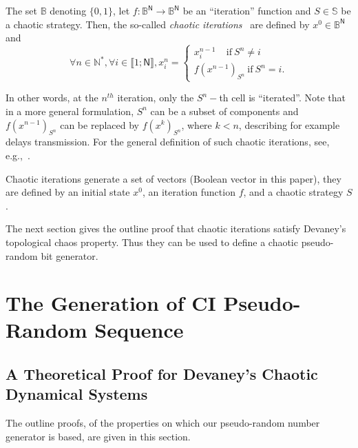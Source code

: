 \documentclass[journal]{IEEEtran}
\begin{document}
\begin{definition}
The set $\mathds{B}$ denoting $\{0,1\}$, let $f:\mathds{B}^{\mathsf{N}}\longrightarrow \mathds{B}^{\mathsf{N}}$ be an ``iteration'' function and $S\in \mathbb{S}
$ be a chaotic strategy. Then, the so-called \emph{chaotic iterations}~\cite{Robert1986} are defined by $x^0\in \mathds{B}^{\mathsf{N}}$ and
\begin{equation}
\forall n\in \mathds{N}^{\ast },\forall i\in \llbracket1;\mathsf{N}\rrbracket ,x_i^n=\left\{
\begin{array}{l}
x_i^{n-1}~~~~~\text{if}~S^n\neq i \\
f(x^{n-1})_{S^n}~\text{if}~S^n=i.\end{array} \right. 
\end{equation}
\end{definition}
In other words, at the $n^{th}$ iteration, only the $S^{n}-$th cell is
\textquotedblleft iterated\textquotedblright . Note that in a more general
formulation, $S^n$ can be a subset of components and $f(x^{n-1})_{S^{n}}$ can
be replaced by $f(x^{k})_{S^{n}}$, where $k < n$, describing for
example delays transmission. For the
general definition of such chaotic iterations, see, e.g.,~\cite{Robert1986}.

Chaotic iterations generate a set of vectors (Boolean vector in this paper),
they are defined by an initial state $x^{0}$, an iteration function $f$, and a chaotic strategy $S$.

The next section gives the outline proof that chaotic iterations satisfy Devaney's topological chaos property. Thus they can be used to define a chaotic pseudo-random bit generator.









\section{The Generation of CI Pseudo-Random Sequence}
\label{The generation of pseudo-random sequence}


\subsection{A Theoretical Proof for Devaney's Chaotic Dynamical Systems}
\label{A theoretical proof for Devaney's chaotic dynamical systems}
The outline proofs, of the properties on which our pseudo-random number generator is based, are given in this section. 
\end{document}
